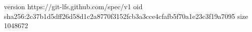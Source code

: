 version https://git-lfs.github.com/spec/v1
oid sha256:2c37b1d5dff26d58d1c2a8770f3152fcb3a3cce4cfafb5f70a1e23c3f19a7095
size 1048672
